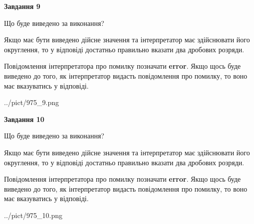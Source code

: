 \documentclass[12pt, ukrainian]{article}
\begin{document}
{\begin {Large}
{\begin {center}\textbf{Завдання 9}\end {center}}\par
Що буде виведено за виконання? \par

Якщо має бути виведено дійсне значення та інтерпретатор має здійснювати його округлення, 
то у відповіді достатньо правильно вказати два дробових розряди.

Повідомлення інтерпретатора про помилку позначати \textbf{error}.
Якщо щось буде виведено до того, як інтерпретатор видасть повідомлення про помилку, 
то воно має вказуватись у відповіді. \par

\begin{center}
	{../pict/975_9.png}
\end{center}
\newpage

{\begin {center}\textbf{Завдання 10}\end {center}}\par
Що буде виведено за виконання? \par

Якщо має бути виведено дійсне значення та інтерпретатор має здійснювати його округлення, 
то у відповіді достатньо правильно вказати два дробових розряди.

Повідомлення інтерпретатора про помилку позначати \textbf{error}.
Якщо щось буде виведено до того, як інтерпретатор видасть повідомлення про помилку, 
то воно має вказуватись у відповіді. \par

\begin{center}
	{../pict/975_10.png}
\end{center}
\newpage

\end {Large}}
\end{document}
